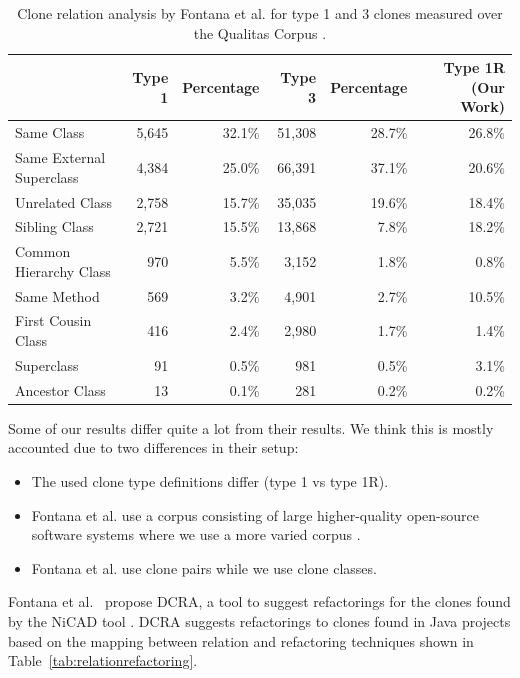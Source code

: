 \begin{table}[H]
\centering
\begin{tabular}{@{}lrrrrr@{}}
\toprule
                         & Type 1 & Percentage & Type 3 & Percentage & Type 1R (Our Work) \\ \midrule
Same Class               & 5,645  & 32.1\%     & 51,308 & 28.7\% & 26.8\%    \\
Same External Superclass & 4,384  & 25.0\%     & 66,391 & 37.1\% & 20.6\%   \\
Unrelated Class          & 2,758  & 15.7\%     & 35,035 & 19.6\% & 18.4\%    \\
Sibling Class            & 2,721  & 15.5\%     & 13,868 & 7.8\%  & 18.2\%    \\
Common Hierarchy Class   & 970    & 5.5\%      & 3,152  & 1.8\%  & 0.8\%    \\
Same Method              & 569    & 3.2\%      & 4,901  & 2.7\%  & 10.5\%    \\
First Cousin Class       & 416    & 2.4\%      & 2,980  & 1.7\%  & 1.4\%    \\
Superclass               & 91     & 0.5\%      & 981    & 0.5\%  & 3.1\%    \\
Ancestor Class           & 13     & 0.1\%      & 281    & 0.2\%  & 0.2\%    \\ \bottomrule
\end{tabular}
\caption{Clone relation analysis by Fontana et al. \cite{fontana2012duplicated} for type 1 and 3 clones measured over the Qualitas Corpus \cite{tempero2010qualitas}.}
\label{tab:dcra-relation}
\end{table}

Some of our results differ quite a lot from their results. We think this is mostly accounted due to two differences in their setup:
\begin{itemize}
\item The used clone type definitions differ (type 1 vs type 1R).
\item Fontana et al. use a corpus consisting of large higher-quality open-source software systems \cite{tempero2010qualitas} where we use a more varied corpus \cite{githubCorpus2013}.
\item Fontana et al. use clone pairs while we use clone classes.
\end{itemize}

Fontana et al.~\cite{fontana2012duplicated, fontana2015duplicated} propose DCRA, a tool to suggest refactorings for the clones found by the NiCAD tool \cite{roy2008nicad, cordy2011nicad}. DCRA suggests refactorings to clones found in Java projects based on the mapping between relation and refactoring techniques shown in Table~\ref{tab:relationrefactoring}.

